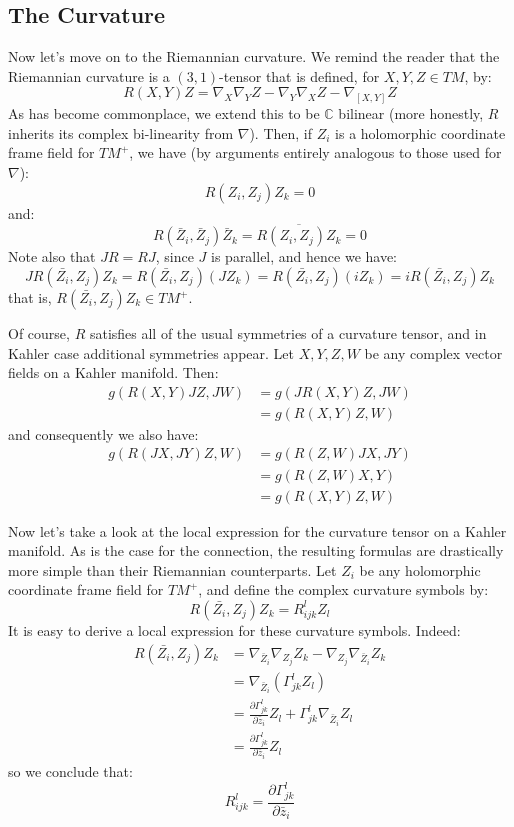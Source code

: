 \documentclass[11pt]{amsart}
\theoremstyle{definition}
\def \C{ \mathbb{C} }
\def \del{ \partial }
\begin{document}
\subsection{The Curvature}

Now let's move on to the Riemannian curvature.  We remind the reader that the Riemannian curvature is a $(3,1)$-tensor that is defined, for $X,Y,Z \in TM$, by:
%
$$ R(X,Y)Z = \nabla_{X} \nabla_{Y} Z - \nabla_{Y} \nabla_{X} Z - \nabla_{[X,Y]} Z $$
%
As has become commonplace, we extend this to be $\C$ bilinear (more honestly, $R$ inherits its complex bi-linearity from $\nabla$).  Then, if $Z_i$ is a holomorphic coordinate frame field for $TM^{+}$, we have (by arguments entirely analogous to those used for $\nabla$):
%
$$ R(Z_i, Z_j) Z_k = 0 $$
%
and:
%
$$ R( \bar{Z}_i, \bar{Z}_j ) \bar{Z}_k = \overline{ R(Z_i, Z_j ) Z_k } = 0 $$
%
Note also that $JR = RJ$, since $J$ is parallel, and hence we have:
%
$$ J R( \bar{Z_i}, Z_j ) Z_k = R( \bar{Z_i}, Z_j )(J Z_k) = R( \bar{Z_i}, Z_j )( i Z_k) = i R( \bar{Z_i}, Z_j ) Z_k $$
%
that is, $ R( \bar{Z_i}, Z_j ) Z_k \in TM^{+} $.  


Of course, $R$ satisfies all of the usual symmetries of a curvature tensor, and in Kahler case additional symmetries appear.  Let $X,Y,Z,W$ be any complex vector fields on a Kahler manifold.  Then:
%
\begin{align*}
g( R(X,Y) JZ, JW ) &=  g( J R(X,Y) Z, JW ) \\
&= g( R(X,Y) Z, W )
\end{align*}
%
and consequently we also have:
%
\begin{align*}
g( R( JX, JY ) Z, W ) &= g( R(Z, W) JX, JY ) \\
&= g( R( Z, W ) X, Y ) \\
&= g( R(X, Y) Z, W )
\end{align*}

Now let's take a look at the local expression for the curvature tensor on a Kahler manifold.  As is the case for the connection, the resulting formulas are drastically more simple than their Riemannian counterparts.  Let $Z_i$ be any holomorphic coordinate frame field for $TM^{+}$, and define the complex curvature symbols by:
%
$$ R( \bar{Z_i}, Z_j ) Z_k = R_{ijk}^l Z_l $$
%
It is easy to derive a local expression for these curvature symbols.  Indeed:
%
\begin{align*}
R( \bar{Z_i}, Z_j ) Z_k &= \nabla_{ \bar{Z}_i } \nabla_{Z_j} Z_k - \nabla_{ Z_j } \nabla_{ \bar{Z}_i } Z_k \\
&= \nabla_{ \bar{Z}_i } \left( \Gamma_{jk}^l Z_l \right ) \\
&= \frac{ \del \Gamma_{jk}^l }{ \del \bar{z}_i } Z_l + \Gamma_{jk}^l \nabla_{ \bar{Z}_i } Z_l \\
&=  \frac{ \del \Gamma_{jk}^l }{ \del \bar{z}_i } Z_l
\end{align*}
%
so we conclude that:
%
$$ R_{ijk}^l = \frac{ \del \Gamma_{jk}^l }{ \del \bar{z}_i } $$
\end{document}
